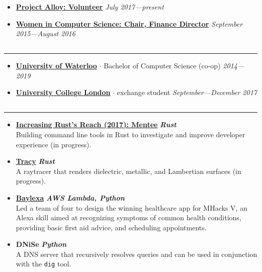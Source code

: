 \documentclass[5pt,letterpaper]{article}
\newcommand{\dt}{$\cdot$ }
\begin{document}
\begin{itemize}[leftmargin=1em, noitemsep]
  \item[]
    {\href{https://www.projectalloy.org/}{\textbf{Project Alloy: Volunteer}} \hfill
    \emph{July 2017---present}}

  \item[]
    {\href{http://wics.uwaterloo.ca}{\textbf{Women in Computer Science: Chair,
      Finance Director}} \hfill
    \emph{September 2015---August 2016}}

\end{itemize}

\subsection*{}
\hrule
\vspace{1.0em}
\begin{itemize}[leftmargin=1em, noitemsep]
  \item[]
    {\href{http://www.uwaterloo.ca}{\textbf{University of Waterloo}}} \dt Bachelor of Computer Science (co-op) \hfill \emph{2014---2019}
  \item[]
    {\href{https://www.ucl.ac.uk/}{\textbf{University College London}}} \dt exchange student
    \hfill \emph{September---December 2017}

\end{itemize}

\subsection*{}
\hrule
\vspace{1.0em}
\begin{itemize}[leftmargin=1em, noitemsep]
  \item []
    \textbf{\href{https://blog.rust-lang.org/2017/06/27/Increasing-Rusts-Reach.html}{Increasing
    Rust's Reach (2017): Mentee}} \hfill \textbf{\emph{Rust}}
    \\
    Building command line tools in Rust to investigate and improve developer
    experience (in progress).
  \item[]
    \textbf{\href{https://github.com/arshiamufti/tracy}{Tracy}} \hfill \textbf{\emph{Rust}}
    \\
    A raytracer that renders dielectric, metallic, and Lambertian surfaces (in progress).
  \item[]
    {\href{http://devpost.com/software/baylexa-fv149r}{\textbf{Baylexa}}}
    \hfill \textbf{\emph{AWS Lambda, Python}}
    \\
    Led a team of four to design the winning healthcare app for MHacks V, an
    Alexa skill aimed at recognizing symptoms of common health conditions,
    providing basic first aid advice, and scheduling appointments.
  \item[]
    \textbf{DNiSe} \hfill \textbf{\emph{Python}}
    \\
    A DNS server that recursively resolves queries and can be used in
    conjunction with the \texttt{dig} tool.
\end{itemize}
\end{document}
